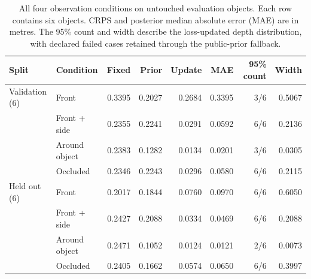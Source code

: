 \begin{table}[tbp]
\centering\small
\setlength{\tabcolsep}{4pt}
\caption{All four observation conditions on untouched evaluation objects. Each row contains six objects. CRPS and posterior median absolute error (MAE) are in metres. The 95\% count and width describe the loss-updated depth distribution, with declared failed cases retained through the public-prior fallback.}
\label{tab:depth-calibration-conditions}
\begin{tabular}{llrrrrrr}
\toprule
Split & Condition & Fixed & Prior & Update & MAE & 95\% count & Width \\
\midrule
Validation (6) & Front & 0.3395 & 0.2027 & 0.2684 & 0.3395 & 3/6 & 0.5067 \\
 & Front + side & 0.2355 & 0.2241 & 0.0291 & 0.0592 & 6/6 & 0.2136 \\
 & Around object & 0.2383 & 0.1282 & 0.0134 & 0.0201 & 3/6 & 0.0305 \\
 & Occluded & 0.2346 & 0.2243 & 0.0296 & 0.0580 & 6/6 & 0.2115 \\
\midrule
Held out (6) & Front & 0.2017 & 0.1844 & 0.0760 & 0.0970 & 6/6 & 0.6050 \\
 & Front + side & 0.2427 & 0.2088 & 0.0334 & 0.0469 & 6/6 & 0.2088 \\
 & Around object & 0.2471 & 0.1052 & 0.0124 & 0.0121 & 2/6 & 0.0073 \\
 & Occluded & 0.2405 & 0.1662 & 0.0574 & 0.0650 & 6/6 & 0.3997 \\
\bottomrule
\end{tabular}
\end{table}
